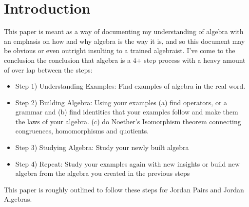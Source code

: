 \section{Introduction}
This paper is meant as a way of documenting my understanding of 
algebra with an emphasis on how and why algebra is the way it is, 
and so this document may be obvious or even outright insulting to a trained algebraist.
I've come to the conclusion the conclusion that algebra is a 4+ step process with a heavy amount of over lap between the steps:
\begin{itemize}
\item[]\hspace{-20pt}Step 1) Understanding Examples: Find examples of algebra in the real word. 
\item[]\hspace{-20pt}Step 2) Building Algebra: Using your examples (a) find operators, or a grammar and (b) find identities that your examples follow and make them the laws of your algebra. (c) do Noether's Isomorphism theorem connecting congruences, homomorphisms and quotients.
\item[]\hspace{-20pt}Step 3) Studying Algebra: Study your newly built algebra %
\item[]\hspace{-20pt}Step 4) Repeat: Study your examples again with new insights or build new algebra from the algebra you created in the previous steps
\end{itemize}

This paper is roughly outlined to follow these steps for Jordan Pairs and Jordan Algebras.

